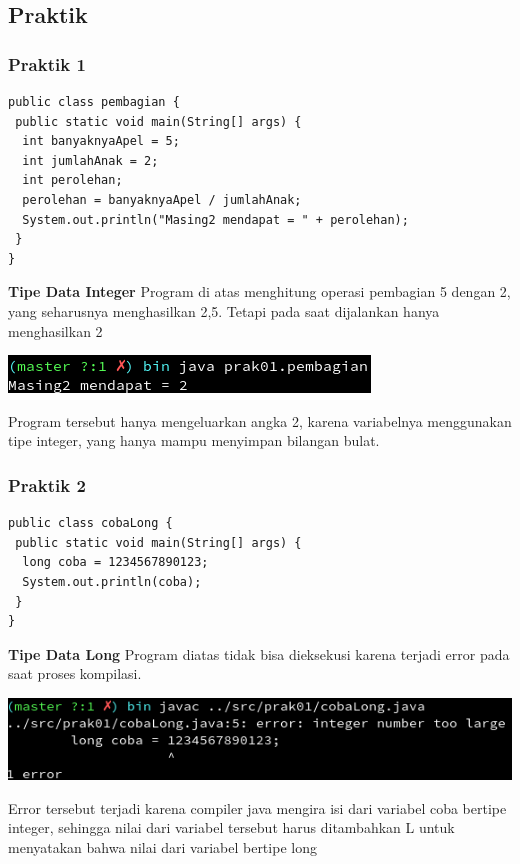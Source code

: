 \documentclass[a4paper,12pt]{article}
\begin{document}
\subsection{Praktik}
\subsubsection{Praktik 1}
\begin{lstlisting}
public class pembagian {
 public static void main(String[] args) {
  int banyaknyaApel = 5;
  int jumlahAnak = 2;
  int perolehan;
  perolehan = banyaknyaApel / jumlahAnak;
  System.out.println("Masing2 mendapat = " + perolehan);
 }
}
\end{lstlisting}

\textbf{Tipe Data Integer}
Program di atas menghitung operasi pembagian 5 dengan 2, yang seharusnya menghasilkan 2,5.
Tetapi pada saat dijalankan hanya menghasilkan 2
\begin{center}
    \includegraphics[scale=1]{1.png} 
\end{center}
Program tersebut hanya mengeluarkan angka 2, karena variabelnya menggunakan tipe
integer, yang hanya mampu menyimpan bilangan bulat.

\subsubsection{Praktik 2}
\begin{lstlisting}
public class cobaLong {
 public static void main(String[] args) {
  long coba = 1234567890123;
  System.out.println(coba);
 }
}
\end{lstlisting}

\textbf{Tipe Data Long}
Program diatas tidak bisa dieksekusi karena terjadi error
pada saat proses kompilasi.

\begin{center}
    \includegraphics[width=\textwidth]{2.png}
\end{center}

Error tersebut terjadi karena compiler java mengira isi dari variabel coba
bertipe integer, sehingga nilai dari variabel tersebut harus ditambahkan L
untuk menyatakan bahwa nilai dari variabel bertipe long
\end{document}
